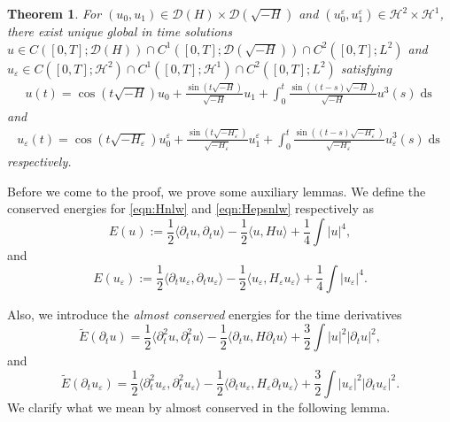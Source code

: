 \documentclass[11pt, oneside]{article}   	%
\newcommand{\assign}{:=}
\newcommand{\tmem}[1]{{\em #1\/}}
\newcommand{\tmop}[1]{\ensuremath{\operatorname{#1}}}
\newtheorem{theorem}{Theorem}[section]
\newcommand{\ssp}{\mathscr{H}}
\begin{document}
\begin{theorem}\label{thm:wavefix}
	For $(u_0,u_1)\in\mathscr{D}(H)\times\mathscr{D}(\sqrt{-H})$ and $(u^\varepsilon_0,u^\varepsilon_1)\in \ssp^2\times \ssp^1$, there exist unique global in time solutions $u\in C([0,T];\mathscr{D}(H))\cap C^1([0,T];\mathscr{D}(\sqrt{-H}))\cap C^2([0,T];L^2)$ and $u_\varepsilon\in C([0,T];\ssp^2)\cap C^1([0,T];\ssp^1)\cap C^2([0,T];L^2)$ satisfying
	\begin{align*}
	u(t) = \cos \left( t \sqrt{- H} \right) u_0 + \frac{\sin \left( t
		\sqrt{- H} \right)}{\sqrt{- H}} u_1 +\int_{0}^{t}
	\frac{\sin \left( (t-s) \sqrt{- H} \right)}{\sqrt{- H}} u^3 (s) \tmop{ds}
	\end{align*}
	and
	\begin{align*}
	u_\varepsilon(t) = \cos \left( t \sqrt{- H_\varepsilon} \right) u^\varepsilon_0 + \frac{\sin \left( t
		\sqrt{- H_\varepsilon} \right)}{\sqrt{- H_\varepsilon}} u^\varepsilon_1 + \int_{0}^{t}
	\frac{\sin \left( (t-s) \sqrt{- H_\varepsilon} \right)}{\sqrt{- H_\varepsilon}} u_\varepsilon^3 ( s) \tmop{ds}
	\end{align*}
	respectively.
\end{theorem}
Before we come to the proof, we prove some auxiliary lemmas. 
We define the conserved energies  for  \eqref{eqn:Hnlw} and \eqref{eqn:Hepsnlw} respectively as
\[ E (u) \assign \frac{1}{2} \langle \partial_t u,
\partial_t u \rangle - \frac{1}{2} \langle u,
H u \rangle + \frac{1}{4} \int |
u |^4, \]
and
\[ E (u_{\varepsilon}) \assign \frac{1}{2} \langle \partial_t u_{\varepsilon},
\partial_t u_{\varepsilon} \rangle - \frac{1}{2} \langle u_{\varepsilon},
H_{\varepsilon} u_{\varepsilon} \rangle + \frac{1}{4} \int |
u_{\varepsilon} |^4. \]

Also, we introduce the {\tmem{almost conserved}} energies for the time derivatives
\[ \tilde{E} (\partial_t u) = \frac{1}{2} \langle \partial^2_t
u, \partial^2_t u \rangle - \frac{1}{2} \langle
\partial_t u, H \partial_t u
\rangle + \frac{3}{2} \int | u |^2 | \partial_t
u |^2, \]
and
\[ \tilde{E} (\partial_t u_{\varepsilon}) = \frac{1}{2} \langle \partial^2_t
u_{\varepsilon}, \partial^2_t u_{\varepsilon} \rangle - \frac{1}{2} \langle
\partial_t u_{\varepsilon}, H_{\varepsilon} \partial_t u_{\varepsilon}
\rangle + \frac{3}{2} \int | u_{\varepsilon} |^2 | \partial_t
u_{\varepsilon} |^2. \]
We clarify what we mean by almost conserved in the following lemma.
\end{document}
